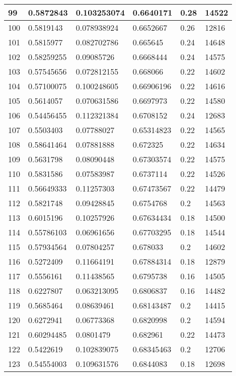 \begin{longtable}{|l|l|l|l|l|l|}
99 & 0.5872843 & 0.103253074 & 0.6640171 & 0.28 & 14522 \\ \hline 
100 & 0.5819143 & 0.078938924 & 0.6652667 & 0.26 & 12816 \\ \hline 
101 & 0.5815977 & 0.082702786 & 0.665645 & 0.24 & 14648 \\ \hline 
102 & 0.58259255 & 0.09085726 & 0.6668444 & 0.24 & 14575 \\ \hline 
103 & 0.57545656 & 0.072812155 & 0.668066 & 0.22 & 14602 \\ \hline 
104 & 0.57100075 & 0.100248605 & 0.66906196 & 0.22 & 14616 \\ \hline 
105 & 0.5614057 & 0.070631586 & 0.6697973 & 0.22 & 14580 \\ \hline 
106 & 0.54456455 & 0.112321384 & 0.6708152 & 0.24 & 12683 \\ \hline 
107 & 0.5503403 & 0.07788027 & 0.65314823 & 0.22 & 14565 \\ \hline 
108 & 0.58641464 & 0.07881888 & 0.672325 & 0.22 & 14634 \\ \hline 
109 & 0.5631798 & 0.08090448 & 0.67303574 & 0.22 & 14575 \\ \hline 
110 & 0.5831586 & 0.07583987 & 0.6737114 & 0.22 & 14526 \\ \hline 
111 & 0.56649333 & 0.11257303 & 0.67473567 & 0.22 & 14479 \\ \hline 
112 & 0.5821748 & 0.09428845 & 0.6754768 & 0.2 & 14563 \\ \hline 
113 & 0.6015196 & 0.10257926 & 0.67634434 & 0.18 & 14500 \\ \hline 
114 & 0.55786103 & 0.06961656 & 0.67703295 & 0.18 & 14544 \\ \hline 
115 & 0.57934564 & 0.07804257 & 0.678033 & 0.2 & 14602 \\ \hline 
116 & 0.5272409 & 0.11664191 & 0.67884314 & 0.18 & 12879 \\ \hline 
117 & 0.5556161 & 0.11438565 & 0.6795738 & 0.16 & 14505 \\ \hline 
118 & 0.6227807 & 0.063213095 & 0.6806837 & 0.16 & 14482 \\ \hline 
119 & 0.5685464 & 0.08639461 & 0.68143487 & 0.2 & 14415 \\ \hline 
120 & 0.6272941 & 0.06773368 & 0.6820998 & 0.2 & 14594 \\ \hline 
121 & 0.60294485 & 0.0801479 & 0.682961 & 0.22 & 14473 \\ \hline 
122 & 0.5422619 & 0.102839075 & 0.68345463 & 0.2 & 12706 \\ \hline 
123 & 0.54554003 & 0.109631576 & 0.6844083 & 0.18 & 12698 \\ \hline 

\end{longtable}
